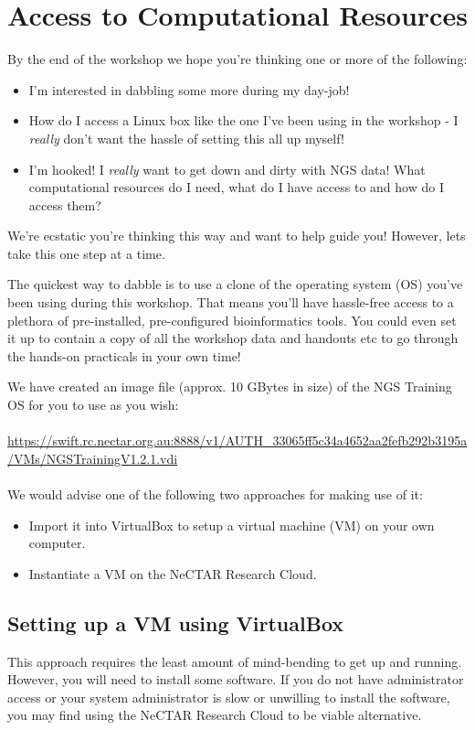 \section{Access to Computational Resources}

By the end of the workshop we hope you're thinking one or more of the following:

\begin{itemize}
\item I'm interested in dabbling some more during my day-job!
\item How do I access a Linux box like the one I've been using in the workshop -
I \emph{really} don't want the hassle of setting this all up myself!
\item I'm hooked! I \emph{really} want to get down and dirty with NGS data! What
computational resources do I need, what do I have access to and how do I access
them?
\end{itemize}

We're ecstatic you're thinking this way and want to help guide you! However, lets
take this one step at a time.

The quickest way to dabble is to use a clone of the operating system (OS) you've
been using during this workshop. That means you'll have hassle-free access to a
plethora of pre-installed, pre-configured bioinformatics tools. You could even set it
up to contain a copy of all the workshop data and handouts etc to go through the
hands-on practicals in your own time!

We have created an image file (approx. 10 GBytes in size) of the NGS Training OS for you to
use as you wish:
\\\\
\url{https://swift.rc.nectar.org.au:8888/v1/AUTH_33065ff5c34a4652aa2fefb292b3195a/VMs/NGSTrainingV1.2.1.vdi}
\\\\
We would advise one of the following two approaches for making use of it:

\begin{itemize}
\item Import it into VirtualBox to setup a virtual machine (VM) on your own
computer.
\item Instantiate a VM on the NeCTAR Research Cloud.
\end{itemize}

\subsection{Setting up a VM using VirtualBox}
This approach requires the least amount of mind-bending to get up and running.
However, you will need to install some software. If you do not have
administrator access or your system administrator is slow or unwilling to
install the software, you may find using the NeCTAR Research Cloud to be viable
alternative.


